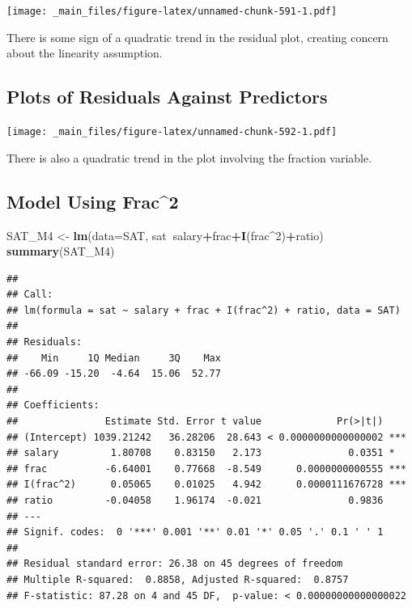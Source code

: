 \documentclass[]{book}
\newenvironment{Shaded}{\begin{snugshade}}{\end{snugshade}}
\newcommand{\KeywordTok}[1]{\textcolor[rgb]{0.13,0.29,0.53}{\textbf{#1}}}
\newcommand{\DataTypeTok}[1]{\textcolor[rgb]{0.13,0.29,0.53}{#1}}
\newcommand{\DecValTok}[1]{\textcolor[rgb]{0.00,0.00,0.81}{#1}}
\newcommand{\StringTok}[1]{\textcolor[rgb]{0.31,0.60,0.02}{#1}}
\newcommand{\OperatorTok}[1]{\textcolor[rgb]{0.81,0.36,0.00}{\textbf{#1}}}
\newcommand{\NormalTok}[1]{#1}
\begin{document}
\texttt{[image: \_main\_files/figure-latex/unnamed-chunk-591-1.pdf]}

There is some sign of a quadratic trend in the residual plot, creating
concern about the linearity assumption.

\subsection{Plots of Residuals Against
Predictors}\label{plots-of-residuals-against-predictors}

\texttt{[image: \_main\_files/figure-latex/unnamed-chunk-592-1.pdf]}

There is also a quadratic trend in the plot involving the fraction
variable.

\subsection{Model Using Frac\^{}2}\label{model-using-frac2}

\begin{Shaded}
\begin{Highlighting}[]
\NormalTok{SAT_M4 <-}\StringTok{ }\KeywordTok{lm}\NormalTok{(}\DataTypeTok{data=}\NormalTok{SAT, sat}\OperatorTok{~}\NormalTok{salary}\OperatorTok{+}\NormalTok{frac}\OperatorTok{+}\KeywordTok{I}\NormalTok{(frac}\OperatorTok{^}\DecValTok{2}\NormalTok{)}\OperatorTok{+}\NormalTok{ratio)}
\KeywordTok{summary}\NormalTok{(SAT_M4)}
\end{Highlighting}
\end{Shaded}

\begin{verbatim}
## 
## Call:
## lm(formula = sat ~ salary + frac + I(frac^2) + ratio, data = SAT)
## 
## Residuals:
##    Min     1Q Median     3Q    Max 
## -66.09 -15.20  -4.64  15.06  52.77 
## 
## Coefficients:
##               Estimate Std. Error t value             Pr(>|t|)    
## (Intercept) 1039.21242   36.28206  28.643 < 0.0000000000000002 ***
## salary         1.80708    0.83150   2.173               0.0351 *  
## frac          -6.64001    0.77668  -8.549      0.0000000000555 ***
## I(frac^2)      0.05065    0.01025   4.942      0.0000111676728 ***
## ratio         -0.04058    1.96174  -0.021               0.9836    
## ---
## Signif. codes:  0 '***' 0.001 '**' 0.01 '*' 0.05 '.' 0.1 ' ' 1
## 
## Residual standard error: 26.38 on 45 degrees of freedom
## Multiple R-squared:  0.8858, Adjusted R-squared:  0.8757 
## F-statistic: 87.28 on 4 and 45 DF,  p-value: < 0.00000000000000022
\end{verbatim}
\end{document}
